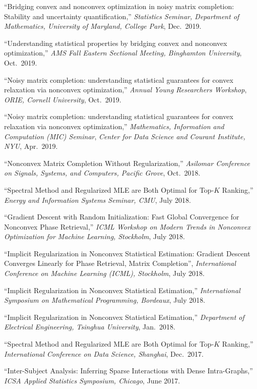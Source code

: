 \documentclass[a4paper, 10pt]{article}
\newenvironment{changemargin}[2]{%
  \begin{list}{}{%
    \setlength{\topsep}{0pt}%
    \setlength{\leftmargin}{#1}%
    \setlength{\rightmargin}{#2}%
    \setlength{\listparindent}{\parindent}%
    \setlength{\itemindent}{\parindent}%
    \setlength{\parsep}{\parskip}%
  }%
  \item[]}{\end{list}
}
\newenvironment{body} {
	\vspace*{-16pt}
	\begin{changemargin}{-0.3in}{-0.5in}
  }	
	{\end{changemargin}
}
\begin{document}
\begin{body}
\begin{enumerate}[label={[{T}{{\arabic*}}]}]
	\item ``Bridging convex and nonconvex optimization in noisy matrix completion: Stability and uncertainty quantification,'' \emph{Statistics Seminar, Department of Mathematics, University of Maryland, College Park}, Dec.~2019.
	\item ``Understanding statistical properties by bridging convex and nonconvex optimization,'' \emph{AMS Fall Eastern Sectional Meeting, Binghamton University}, Oct.~2019.
	\item ``Noisy matrix completion: understanding statistical guarantees for convex relaxation via nonconvex optimization,'' \emph{Annual Young Researchers Workshop}, \emph{ORIE, Cornell University}, Oct.~2019.
	\item ``Noisy matrix completion: understanding statistical guarantees for convex relaxation via nonconvex optimization,'' \emph{Mathematics, Information and Computation (MIC) Seminar}, \emph{Center for Data Science and Courant Institute, NYU}, Apr.~2019.
		\item ``Nonconvex Matrix Completion Without Regularization,'' \emph{Asilomar Conference on Signals, Systems, and Computers, Pacific Grove}, Oct.~2018.
		\item ``Spectral Method and Regularized MLE are Both Optimal for Top-$K$ Ranking,'' \emph{Energy and Information Systems Seminar, CMU}, July 2018.
		\item ``Gradient Descent with Random Initialization: Fast Global Convergence for Nonconvex Phase Retrieval,'' \emph{ICML Workshop on Modern Trends in Nonconvex Optimization for Machine Learning, Stockholm}, July 2018.
		\item ``Implicit Regularization in Nonconvex Statistical Estimation: Gradient Descent Converges Linearly for Phase Retrieval, Matrix Completion'', \emph{International Conference on Machine Learning (ICML), Stockholm}, July 2018.
		\item ``Implicit Regularization in Nonconvex Statistical Estimation,'' \emph{International Symposium on Mathematical Programming, Bordeaux}, July 2018.
		\item ``Implicit Regularization in Nonconvex Statistical Estimation,'' \emph{Department of Electrical Engineering, Tsinghua University}, Jan.~2018.
			
		\item ``Spectral Method and Regularized MLE are Both Optimal for Top-$K$ Ranking,'' \emph{International Conference on Data Science, Shanghai}, Dec.~2017.
		\item ``Inter-Subject Analysis: Inferring Sparse Interactions with Dense Intra-Graphs,'' \emph{ICSA Applied Statistics Symposium, Chicago}, June 2017.
		
		\end{enumerate}
\end{body}
\end{document}
